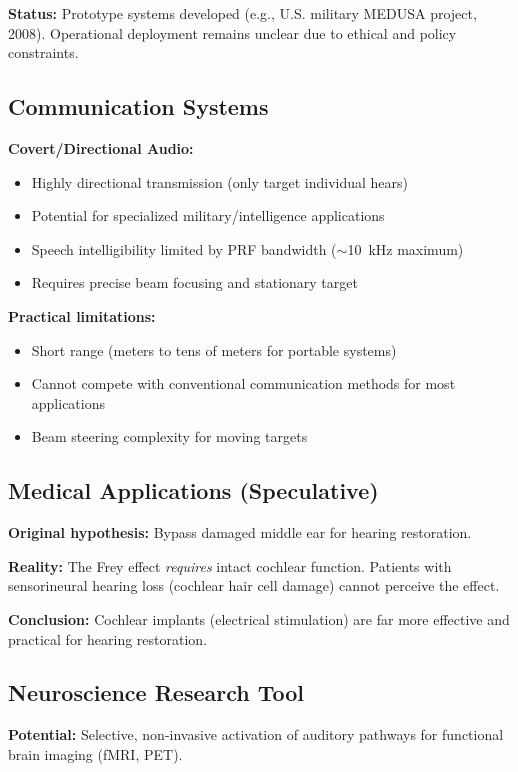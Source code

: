 \textbf{Status:} Prototype systems developed (e.g., U.S. military MEDUSA project, 2008). Operational deployment remains unclear due to ethical and policy constraints.

\subsection{Communication Systems}

\textbf{Covert/Directional Audio:}
\begin{itemize}
\item Highly directional transmission (only target individual hears)
\item Potential for specialized military/intelligence applications
\item Speech intelligibility limited by PRF bandwidth ($\sim$10~kHz maximum)
\item Requires precise beam focusing and stationary target
\end{itemize}

\textbf{Practical limitations:}
\begin{itemize}
\item Short range (meters to tens of meters for portable systems)
\item Cannot compete with conventional communication methods for most applications
\item Beam steering complexity for moving targets
\end{itemize}

\subsection{Medical Applications (Speculative)}

\textbf{Original hypothesis:} Bypass damaged middle ear for hearing restoration.

\textbf{Reality:} The Frey effect \emph{requires} intact cochlear function. Patients with sensorineural hearing loss (cochlear hair cell damage) cannot perceive the effect.

\textbf{Conclusion:} Cochlear implants (electrical stimulation) are far more effective and practical for hearing restoration.

\subsection{Neuroscience Research Tool}

\textbf{Potential:} Selective, non-invasive activation of auditory pathways for functional brain imaging (fMRI, PET).

